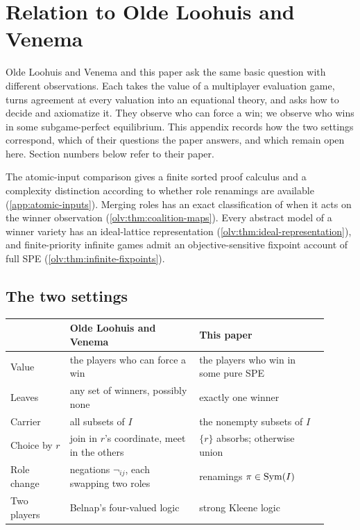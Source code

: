 \section{Relation to Olde Loohuis and Venema}\label{app:olv}

Olde Loohuis and Venema \cite{OldeLoohuisVenema2010} and this paper ask the same basic question with different observations. Each takes the value of a multiplayer evaluation game, turns agreement at every valuation into an equational theory, and asks how to decide and axiomatize it. They observe who can force a win; we observe who wins in some subgame-perfect equilibrium. This appendix records how the two settings correspond, which of their questions the paper answers, and which remain open here. Section numbers below refer to their paper.

The atomic-input comparison gives a finite sorted proof calculus and a
complexity distinction according to whether role renamings are available
(\cref{app:atomic-inputs}). Merging roles has an exact classification of
when it acts on the winner observation (\cref{olv:thm:coalition-maps}).
Every abstract model of a winner variety has an ideal-lattice
representation (\cref{olv:thm:ideal-representation}), and finite-priority
infinite games admit an objective-sensitive fixpoint account of full SPE
(\cref{olv:thm:infinite-fixpoints}).

\subsection{The two settings}

\begin{center}
\begin{tabular}{p{0.17\linewidth}p{0.37\linewidth}p{0.37\linewidth}}
\toprule
& Olde Loohuis and Venema & This paper\\
\midrule
Value & the players who can force a win & the players who win in some pure SPE\\
Leaves & any set of winners, possibly none & exactly one winner\\
Carrier & all subsets of $I$ & the nonempty subsets of $I$\\
Choice by $r$ & join in $r$'s coordinate, meet in the others & $\{r\}$ absorbs; otherwise union\\
Role change & negations $\neg_{ij}$, each swapping two roles & renamings $\pi\in\operatorname{Sym}(I)$\\
Two players & Belnap's four-valued logic & strong Kleene logic\\
\bottomrule
\end{tabular}
\end{center}

